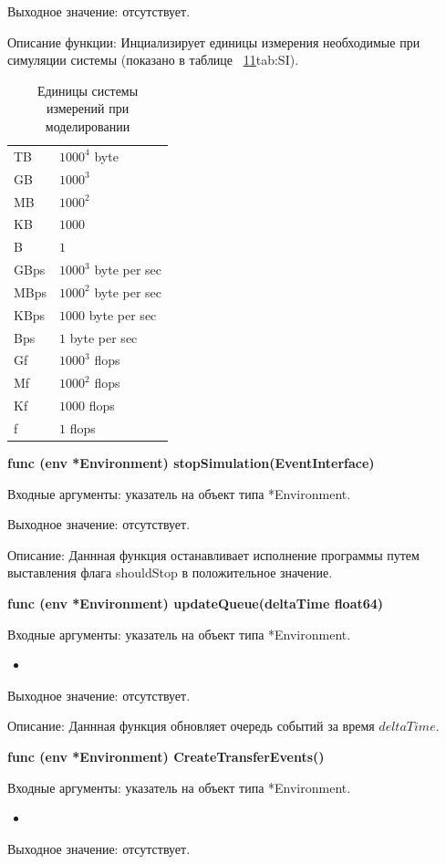 Выходное значение: отсутствует.

Описание функции: Инциализирует единицы измерения необходимые при симуляции системы (показано в таблице ~\ref{tab:SI}\ref{tab:SI}{tab:SI}).
\begin{table}[]
	\centering
	\caption{Единицы системы измерений при моделировании}
	\label{tab:SI}
	\begin{tabularx}{\textwidth}{|X|X|}
		TB   & $1000^4$ byte         \\
		GB   & $1000^3$              \\
		MB   & $1000^2$              \\
		KB   & $1000$                \\
		B    & $1$                   \\
		GBps & $1000^3$ byte per sec \\
		MBps & $1000^2$ byte per sec \\
		KBps & $1000$ byte per sec   \\
		Bps  & $1$ byte per sec      \\
		Gf   & $1000^3$ flops        \\
		Mf   & $1000^2$ flops        \\
		Kf   & $1000$ flops          \\
		f    & $1$ flops            
	\end{tabularx}
\end{table}

\textbf{func (env *Environment) stopSimulation(EventInterface)}

Входные аргументы: указатель на объект типа *Environment.

Выходное значение: отсутствует.

Описание: Даннная функция останавливает исполнение программы путем выставления флага shouldStop в положительное значение.

\textbf{func (env *Environment) updateQueue(deltaTime float64) }

Входные аргументы: указатель на объект типа *Environment.
\begin{itemize}
	\item 
\end{itemize}
Выходное значение: отсутствует.

Описание: Даннная функция обновляет очередь событий за время $deltaTime$. 

\textbf{func (env *Environment) CreateTransferEvents()}

Входные аргументы: указатель на объект типа *Environment.
\begin{itemize}
	\item 
\end{itemize}
Выходное значение: отсутствует.

